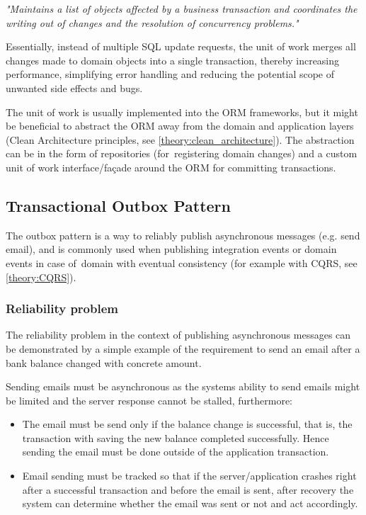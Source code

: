 \textit{"Maintains a list of objects affected by a business transaction and coordinates the writing out of changes and the resolution of concurrency problems."}

Essentially, instead of multiple SQL update requests, the unit of work merges all changes made to domain objects into a single transaction, thereby increasing performance, simplifying error handling and reducing the potential scope of unwanted side effects and bugs.

The unit of work is usually implemented into the ORM frameworks, but it might be beneficial to abstract the ORM away from the domain and application layers (Clean Architecture principles, see \ref{theory:clean_architecture}). The abstraction can be in the form of repositories (for~registering domain changes) and a custom unit of work interface/façade around the ORM for committing transactions.

\subsection{Transactional Outbox Pattern}
\label{theory:outbox}
The outbox pattern is a way to reliably publish asynchronous messages (e.g. send email), and is commonly used when publishing integration events or domain events in case of~domain with eventual consistency (for example with CQRS, see \ref{theory:CQRS}).

\subsubsection{Reliability problem}
The reliability problem in the context of publishing asynchronous messages can be demonstrated by a simple example of the requirement to send an email after a bank balance changed with concrete amount.

Sending emails must be asynchronous as the systems ability to send emails might be limited and the server response cannot be stalled, furthermore:

\begin{itemize}
    \item The email must be send only if the balance change is successful, that is, the transaction with saving the new balance completed successfully. Hence sending the email must be done outside of the application transaction.
    \item Email sending must be tracked so that if the server/application crashes right after a successful transaction and before the email is sent, after recovery the system can determine whether the email was sent or not and act accordingly.
\end{itemize}

